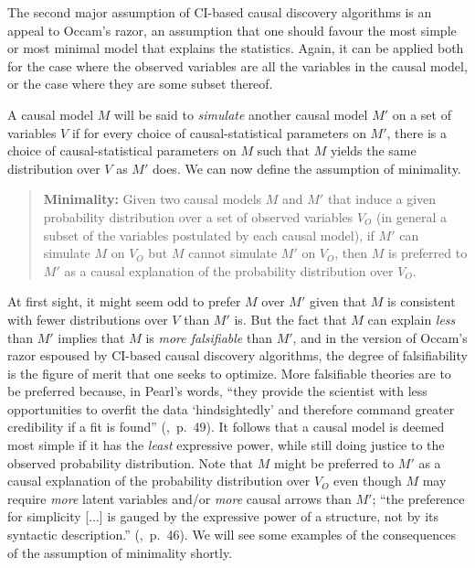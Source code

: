 \documentclass[letterpaper,onecolumn,nofootinbib]{revtex4}
\begin{document}
The second major assumption of CI-based causal discovery algorithms is an appeal to Occam's razor, an assumption that one should favour the most simple or most minimal model that explains the statistics.  Again, it can be applied both for the case where the observed variables are all the variables in the causal model, or the case where they are some subset thereof.

A causal model $M$ will be said to \emph{simulate} another causal model $M'$ on a set of variables $V$ if for every choice of causal-statistical parameters on $M'$, there is a choice of causal-statistical parameters on $M$ such that $M$ yields the same distribution over $V$ as $M'$ does. We can now define the assumption of minimality.

\begin{quote}
\textbf{Minimality: } Given two causal models $M$ and $M'$ that induce a given probability distribution over a set of observed variables $V_O$ (in general a subset of the variables postulated by each causal model), if $M'$ can simulate $M$ on $V_O$ but $M$ cannot simulate $M'$ on $V_O$, then $M$ is preferred to $M'$ as a causal explanation of the probability distribution over $V_O$.
\end{quote}

At first sight, it might seem odd to prefer $M$ over $M'$ given that $M$ is consistent with fewer distributions over $V$ than $M'$ is.  But the fact that $M$ can explain \emph{less} than $M'$ implies that $M$ is \emph{more falsifiable} than $M'$, and in the version of Occam's razor espoused by CI-based causal discovery algorithms, the degree of falsifiability is the figure of merit that one seeks to optimize. More falsifiable theories are to be preferred because, in Pearl's words, ``they provide the scientist with less opportunities to overfit the data `hindsightedly' and therefore command greater credibility if a fit is found'' (\cite{Pearl2009},~p.~49).  It follows that a causal model is deemed most simple if it has the \emph{least} expressive power, while still doing justice to the observed probability distribution.  Note that $M$ might be preferred to $M'$ as a causal explanation of the probability distribution over $V_O$ even though $M$ may require \emph{more} latent variables and/or \emph{more} causal arrows than $M'$;  ``the preference for simplicity [...] is gauged by the expressive power of a structure, not by its syntactic description.'' (\cite{Pearl2009},~p.~46).
We will see some examples of the consequences of the assumption of minimality shortly.
\end{document}
